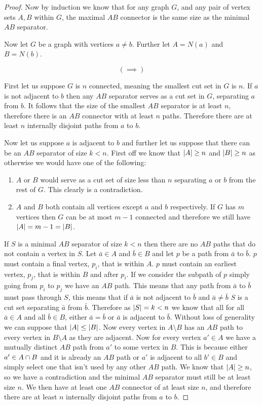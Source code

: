 \documentclass{article}
\begin{document}
\begin{proof}
	Now by induction we know that for any graph $G$, and any pair of vertex sets $A,B$ within $G$, the maximal $AB$ connector is the same size as the minimal $AB$ separator.
	
	Now let $G$ be a graph with vertices $a\not=b$. Further let $A = N(a)$ and $B = N(b)$. 
	
	$$(\implies)$$
	
	First let us suppose $G$ is $n$ connected, meaning the smallest cut set in $G$ is $n$. If $a$ is not adjacent to $b$ then any $AB$ separator serves as a cut set in $G$, separating $a$ from $b$. It follows that the size of the smallest $AB$ separator is at least $n$, therefore there is an $AB$ connector with at least $n$ paths. Therefore there are at least $n$ internally disjoint paths from $a$ to $b$.
	
	Now let us suppose $a$ is adjacent to $b$ and further let us suppose that there can be an $AB$ separator of size $k < n$. First off we know that $\left| {A} \right| \ge n$ and $\left| {B} \right| \ge n$ as otherwise we would have one of the following:
	\begin{enumerate}
		\item $A$ or $B$ would serve as a cut set of size less than $n$ separating $a$ or $b$ from the rest of $G$. This clearly is a contradiction.
		\item $A$ and $B$ both contain all vertices except $a$ and $b$ respectively. If $G$ has $m$ vertices then $G$ can be at most $m-1$ connected and therefore we still have $\left| {A} \right| = m-1 = \left| {B} \right|$.
	\end{enumerate}
	If $S$ is a minimal $AB$ separator of size $k < n$ then there are no $AB$ paths that do not contain a vertex in $S$. Let $\bar a\in A$ and $\bar b \in B$ and let $p$ be a path from $\bar a$ to $\bar b$. $p$ must contain a final vertex, $p_i$, that is within $A$. $p$ must contain an earliest vertex, $p_j$, that is within $B$ and after $p_i$. If we consider the subpath of $p$ simply going from $p_i$ to $p_j$ we have an $AB$ path. This means that any path from $\bar a$ to $\bar b$ must pass through $S$, this means that if $\bar a$ is not adjacent to $\bar b$ and $\bar a\not=\bar b$ $S$ is a cut set separating $\bar a$ from $\bar b$. Therefore as $\left| {S} \right| = k < n$ we know that all for all $\bar a \in A$ and all $\bar b\in B$, either $\bar a= \bar b$ or $\bar a$ is adjacent to $\bar b$. Without loss of generality we can suppose that $\left| {A} \right| \le \left| {B} \right|$. Now every vertex in $A\setminus B$ has an $AB$ path to every vertex in $B \setminus A$ as they are adjacent. Now for every vertex $a'\in A$ we have a mutually distinct $AB$ path from $a'$ to some vertex in $B$. This is because either $a'\in A\cap B$ and it is already an $AB$ path or $a'$ is adjacent to all $b' \in B$ and simply select one that isn't used by any other $AB$ path. We know that $\left| {A} \right| \ge n$, so we have a contradiction and the minimal $AB$ separator must still be at least size $n$. We then have at least one $AB$ connector of at least size $n$, and therefore there are at least $n$ internally disjoint paths from $a$ to $b$.
	

\end{proof}
\end{document}
